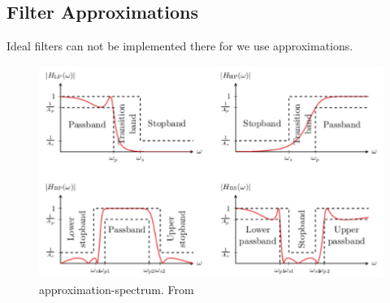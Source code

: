 
\subsection{Filter Approximations}
Ideal filters can not be implemented there for we use approximations. 

\begin{figure}[H]
    \centering
    \includegraphics[width=12cm]{image/approximation-spectrum.pdf}
    \caption{approximation-spectrum. From \cite{}}
    \label{fig:approximation-spectrum}
\end{figure}

